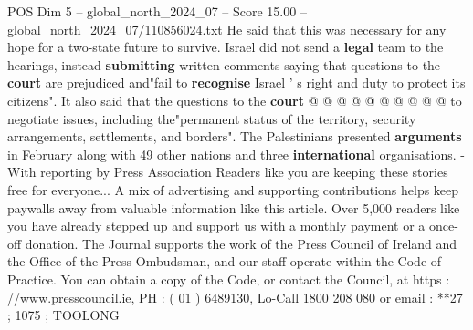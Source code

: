 \begin{textsample}{POS Dim 5 – global\_north\_2024\_07 – Score 15.00 – global\_north\_2024\_07/110856024.txt}
He said that this was necessary for any hope for a two-state future to survive.
Israel did not send a \textbf{legal} team to the hearings, instead \textbf{submitting} written comments saying that questions to the \textbf{court} are prejudiced and"fail to \textbf{recognise} Israel ' s right and duty to protect its citizens".
It also said that the questions to the \textbf{court} @ @ @ @ @ @ @ @ @ @ to negotiate issues, including the"permanent status of the territory, security arrangements, settlements, and borders".
The Palestinians presented \textbf{arguments} in February along with 49 other nations and three \textbf{international} organisations. -With reporting by Press Association Readers like you are keeping these stories free for everyone...
A mix of advertising and supporting contributions helps keep paywalls away from valuable information like this article.
Over 5,000 readers like you have already stepped up and support us with a monthly payment or a once-off donation.
The Journal supports the work of the Press Council of Ireland and the Office of the Press Ombudsman, and our staff operate within the Code of Practice.
You can obtain a copy of the Code, or contact the Council, at https : //www.presscouncil.ie, PH : ( 01 ) 6489130, Lo-Call 1800 208 080 or email : **27 ; 1075 ; TOOLONG

\end{textsample}
